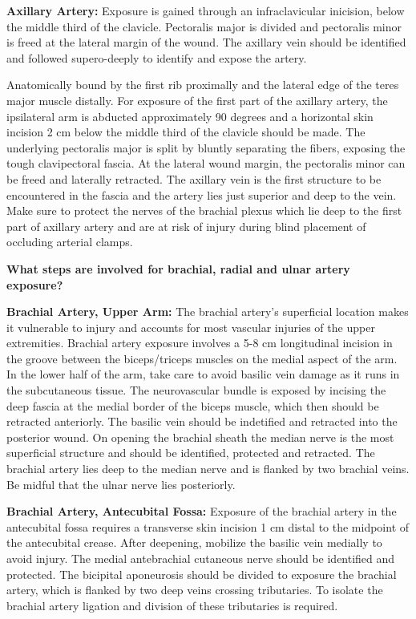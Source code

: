 \documentclass[
]{book}
\begin{document}
\textbf{Axillary Artery:} Exposure is gained through an infraclavicular
inicision, below the middle third of the clavicle. Pectoralis major is
divided and pectoralis minor is freed at the lateral margin of the
wound. The axillary vein should be identified and followed supero-deeply
to identify and expose the artery.

Anatomically bound by the first rib proximally and the lateral edge of
the teres major muscle distally. For exposure of the first part of the
axillary artery, the ipsilateral arm is abducted approximately 90
degrees and a horizontal skin incision 2 cm below the middle third of
the clavicle should be made. The underlying pectoralis major is split by
bluntly separating the fibers, exposing the tough clavipectoral fascia.
At the lateral wound margin, the pectoralis minor can be freed and
laterally retracted. The axillary vein is the first structure to be
encountered in the fascia and the artery lies just superior and deep to
the vein. Make sure to protect the nerves of the brachial plexus which
lie deep to the first part of axillary artery and are at risk of injury
during blind placement of occluding arterial clamps.
\citep{garygwindAnatomicExposuresVascular2013}

\textbf{What steps are involved for brachial, radial and ulnar artery
exposure?}

\textbf{Brachial Artery, Upper Arm:} The brachial artery's superficial
location makes it vulnerable to injury and accounts for most vascular
injuries of the upper extremities. Brachial artery exposure involves a
5-8 cm longitudinal incision in the groove between the biceps/triceps
muscles on the medial aspect of the arm. In the lower half of the arm,
take care to avoid basilic vein damage as it runs in the subcutaneous
tissue. The neurovascular bundle is exposed by incising the deep fascia
at the medial border of the biceps muscle, which then should be
retracted anteriorly. The basilic vein should be indetified and
retracted into the posterior wound. On opening the brachial sheath the
median nerve is the most superficial structure and should be identified,
protected and retracted. The brachial artery lies deep to the median
nerve and is flanked by two brachial veins. Be midful that the ulnar
nerve lies posteriorly.

\textbf{Brachial Artery, Antecubital Fossa:} Exposure of the brachial artery
in the antecubital fossa requires a transverse skin incision 1 cm distal
to the midpoint of the antecubital crease. After deepening, mobilize the
basilic vein medially to avoid injury. The medial antebrachial cutaneous
nerve should be identified and protected. The bicipital aponeurosis
should be divided to exposure the brachial artery, which is flanked by
two deep veins crossing tributaries. To isolate the brachial artery
ligation and division of these tributaries is required.
\end{document}
